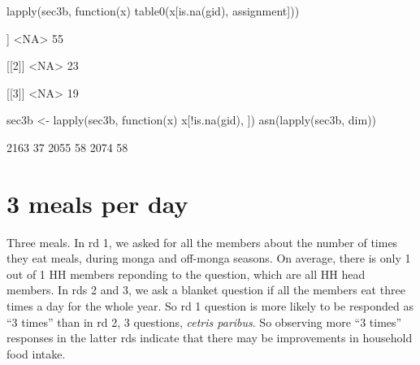 \begin{Schunk}
\begin{Sinput}
lapply(sec3b, function(x) table0(x[is.na(gid), assignment]))
\end{Sinput}
\begin{Soutput}
[[1]]
<NA> 
  55 

[[2]]
<NA> 
  23 

[[3]]
<NA> 
  19 
\end{Soutput}
\begin{Sinput}
sec3b <- lapply(sec3b, function(x) x[!is.na(gid), ])
asn(lapply(sec3b, dim))
\end{Sinput}
\begin{Soutput}
[1] 2163   37 2055   58 2074   58
\end{Soutput}
\end{Schunk}


\section{3 meals per day}

	Three meals. In rd 1, we asked for all the members about the number of times they eat meals, during monga and off-monga seasons. On average, there is only 1 out of 1 HH members reponding to the question, which are all HH head members. In rds 2 and 3, we ask a blanket question if all the members eat three times a day for the whole year. So rd 1 question is more likely to be responded as ``3 times'' than in rd 2, 3 questions, \textit{cetris paribus}. So observing more ``3 times'' responses in the latter rds indicate that there may be improvements in household food intake. 


